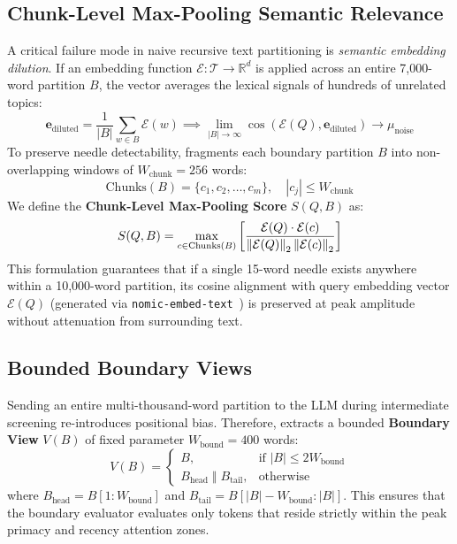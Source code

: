 \subsection{Chunk-Level Max-Pooling Semantic Relevance}
\label{subsec:max_pooling}
A critical failure mode in naive recursive text partitioning is \emph{semantic embedding dilution}. If an embedding function $\mathcal{E}: \mathcal{T} \to \mathbb{R}^d$ is applied across an entire 7,000-word partition $B$, the vector averages the lexical signals of hundreds of unrelated topics:
\begin{equation}
    \mathbf{e}_{\text{diluted}} = \frac{1}{|B|} \sum_{w \in B} \mathcal{E}(w) \implies \lim_{|B| \to \infty} \cos(\mathcal{E}(Q), \mathbf{e}_{\text{diluted}}) \to \mu_{\text{noise}}
\end{equation}
To preserve needle detectability, \RBER{} fragments each boundary partition $B$ into non-overlapping windows of $W_{\text{chunk}} = 256$ words:
\begin{equation}
    \text{Chunks}(B) = \{c_1, c_2, \dots, c_m\}, \quad |c_j| \le W_{\text{chunk}}
\end{equation}
We define the \textbf{Chunk-Level Max-Pooling Score} $S(Q, B)$ as:
\begin{equation}
    S(Q, B) = \max_{c \in \text{Chunks}(B)} \left[ \frac{\mathcal{E}(Q) \cdot \mathcal{E}(c)}{\left\lVert\mathcal{E}(Q)\right\rVert_2 \left\lVert\mathcal{E}(c)\right\rVert_2} \right]
\end{equation}
This formulation guarantees that if a single 15-word needle exists anywhere within a 10,000-word partition, its cosine alignment with query embedding vector $\mathcal{E}(Q)$ (generated via \texttt{nomic-embed-text}~\cite{nussbaum2024nomic}) is preserved at peak amplitude without attenuation from surrounding text.

\subsection{Bounded Boundary Views}
Sending an entire multi-thousand-word partition to the LLM during intermediate screening re-introduces positional bias. Therefore, \RBER{} extracts a bounded \textbf{Boundary View} $V(B)$ of fixed parameter $W_{\text{bound}} = 400$ words:
\begin{equation}
    V(B) = \begin{cases}
        B, & \text{if } |B| \le 2 W_{\text{bound}} \\
        B_{\text{head}} \;\mathbin{\Vert}\; B_{\text{tail}}, & \text{otherwise}
    \end{cases}
\end{equation}
where $B_{\text{head}} = B[1 : W_{\text{bound}}]$ and $B_{\text{tail}} = B[|B|-W_{\text{bound}} : |B|]$. This ensures that the boundary evaluator evaluates only tokens that reside strictly within the peak primacy and recency attention zones.

